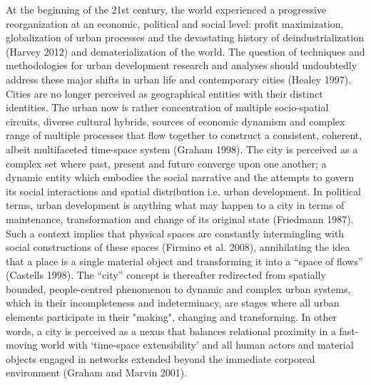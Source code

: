 \documentclass[11pt]{report}
\begin{document}
At the beginning of the 21st century, the world experienced a progressive reorganization at an economic, political and social level: profit maximization, globalization of urban processes and the devastating history of deindustrialization (Harvey 2012) and dematerialization of the world. The question of techniques and methodologies for urban development research and analyses should undoubtedly address these major shifts in urban life and contemporary cities (Healey 1997). 
\\
Cities are no longer perceived as geographical entities with their distinct identities. The urban now is rather concentration of multiple socio-spatial circuits, diverse cultural hybrids, sources of economic dynamism and complex range of multiple processes that flow together to construct a consistent, coherent, albeit multifaceted time-space system (Graham 1998). The city is perceived as a complex set where past, present and future converge upon one another; a dynamic entity which embodies the social narrative and the attempts to govern its social interactions and spatial distribution i.e. urban development. In political terms, urban development is anything what may happen to a city in terms of maintenance, transformation and change of its original state (Friedmann 1987). Such a context implies that physical spaces are constantly intermingling with social constructions of these spaces (Firmino et al. 2008), annihilating the idea that a place is a single material object and transforming it into a “space of flows” (Castells 1998). The “city” concept is thereafter redirected from spatially bounded, people-centred phenomenon to dynamic and complex urban systems, which in their incompleteness and indeterminacy, are stages where all urban elements participate in their "making", changing and transforming. In other words, a city is perceived as a nexus that balances relational proximity in a fast-moving world with ‘time-space extensibility’ and all human actors and material objects engaged in networks extended beyond the immediate corporeal environment (Graham and Marvin 2001). 
\\
\end{document}
